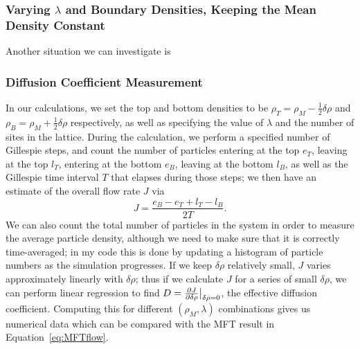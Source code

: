 \subsubsection{Varying $\lambda$ and Boundary Densities, Keeping the Mean Density Constant}
Another situation we can investigate is 


\subsubsection{Diffusion Coefficient Measurement}
In our calculations, we set the top and bottom densities to be $\rho_T = \rho_M - \frac{1}{2} \delta\rho$ and $\rho_B = \rho_M + \frac{1}{2} \delta\rho$ respectively, as well as specifying the value of $\lambda$ and the number of sites
in the lattice. During the calculation, we perform a specified number
of Gillespie steps, and count the number of particles entering at the top $e_T$, leaving at the top $l_T$, entering at the bottom $e_B$, leaving at the bottom $l_B$, as well as the Gillespie time interval $T$ that elapses during
those steps; we then have an estimate of the overall flow rate $J$ via
\begin{equation}
 J = \frac{e_B-e_T+l_T-l_B}{2T}.
\end{equation}
We can also count the total number of particles in the system in order to measure the average particle density, although we need to make sure that it is correctly time-averaged; in my code this is done by updating a histogram of particle numbers
as the simulation progresses.
If we keep $\delta\rho$ relatively small, $J$ varies approximately linearly with $\delta\rho$; thus if we calculate $J$ for a series of small $\delta \rho$, we can perform linear regression to find $D=\frac{\partial J}{\partial \delta\rho}\big|_{\delta\rho=0}$,
the effective diffusion coefficient. Computing this for different $(\rho_M, \lambda)$ combinations gives us numerical data which can be compared with the MFT result in Equation~\ref{eq:MFTflow}.
